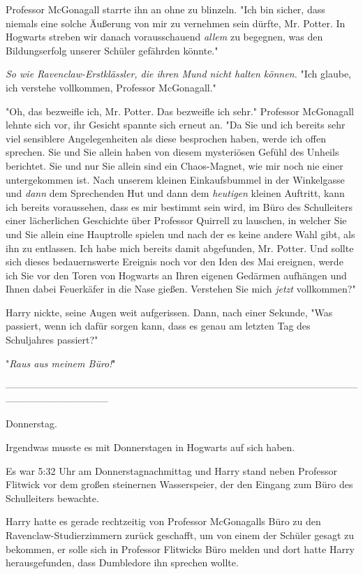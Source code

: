 {Professor McGonagall starrte ihn an ohne zu blinzeln. "Ich bin sicher, dass niemals eine solche Äußerung von mir zu vernehmen sein dürfte, Mr. Potter. In Hogwarts streben wir danach vorausschauend \emph{allem} zu begegnen, was den Bildungserfolg unserer Schüler gefährden könnte."

\emph{So wie Ravenclaw-Erstklässler, die ihren Mund nicht halten können.} "Ich glaube, ich verstehe vollkommen, Professor McGonagall."

"Oh, das bezweifle ich, Mr. Potter. Das bezweifle ich sehr." Professor McGonagall lehnte sich vor, ihr Gesicht spannte sich erneut an. "Da Sie und ich bereits sehr viel sensiblere Angelegenheiten als diese besprochen haben, werde ich offen sprechen. Sie und Sie allein haben von diesem mysteriösen Gefühl des Unheils berichtet. Sie und nur Sie allein sind ein Chaos-Magnet, wie mir noch nie einer untergekommen ist. Nach unserem kleinen Einkaufsbummel in der Winkelgasse und \emph{dann} dem Sprechenden Hut und dann dem \emph{heutigen} kleinen Auftritt, kann ich bereits voraussehen, dass es mir bestimmt sein wird, im Büro des Schulleiters einer lächerlichen Geschichte über Professor Quirrell zu lauschen, in welcher Sie und Sie allein eine Hauptrolle spielen und nach der es keine andere Wahl gibt, als ihn zu entlassen. Ich habe mich bereits damit abgefunden, Mr. Potter. Und sollte sich dieses bedauernswerte Ereignis noch vor den Iden des Mai ereignen, werde ich Sie vor den Toren von Hogwarts an Ihren eigenen Gedärmen aufhängen und Ihnen dabei Feuerkäfer in die Nase gießen. Verstehen Sie mich \emph{jetzt} vollkommen?"

Harry nickte, seine Augen weit aufgerissen. Dann, nach einer Sekunde, "Was passiert, wenn ich dafür sorgen kann, dass es genau am letzten Tag des Schuljahres passiert?"

"\emph{Raus aus meinem Büro!}"

--------------------------------------------------------------------------------------------------------------------------------------------

Donnerstag.

Irgendwas musste es mit Donnerstagen in Hogwarts auf sich haben.

Es war 5:32 Uhr am Donnerstagnachmittag und Harry stand neben Professor Flitwick vor dem großen steinernen Wasserspeier, der den Eingang zum Büro des Schulleiters bewachte.

Harry hatte es gerade rechtzeitig von Professor McGonagalls Büro zu den Ravenclaw-Studierzimmern zurück geschafft, um von einem der Schüler gesagt zu bekommen, er solle sich in Professor Flitwicks Büro melden und dort hatte Harry herausgefunden, dass Dumbledore ihn sprechen wollte.

}
